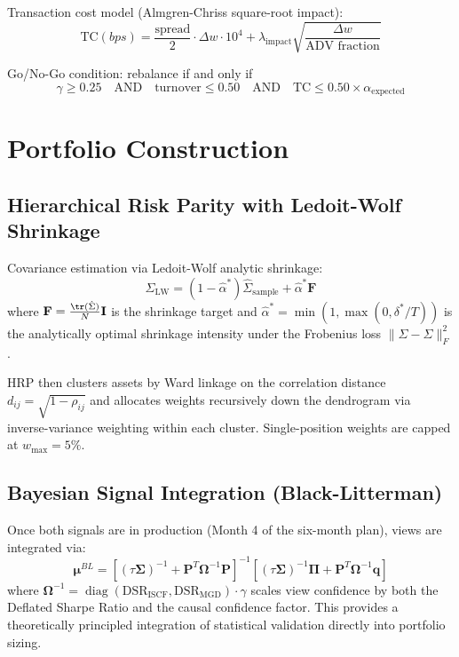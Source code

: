 \documentclass[12pt,a4paper]{article}
\begin{document}
Transaction cost model (Almgren-Chriss square-root impact):
\begin{equation}
  \text{TC}(bps) = \frac{\text{spread}}{2} \cdot \Delta w \cdot 10^4 + \lambda_{\text{impact}}\sqrt{\frac{\Delta w}{\text{ADV fraction}}}
  \label{eq:tca}
\end{equation}

Go/No-Go condition: rebalance if and only if
\begin{equation}
  \gamma \geq 0.25 \quad \text{AND} \quad \text{turnover} \leq 0.50 \quad \text{AND} \quad \text{TC} \leq 0.50 \times \alpha_{\text{expected}}
  \label{eq:gonogo}
\end{equation}

\section{Portfolio Construction}
\label{sec:portfolio}

\subsection{Hierarchical Risk Parity with Ledoit-Wolf Shrinkage}

Covariance estimation via Ledoit-Wolf \citeyearpar{ledoit2004} analytic shrinkage:
\begin{equation}
  \hat{\Sigma}_{\text{LW}} = (1 - \hat{\alpha}^*)\hat{\Sigma}_{\text{sample}} + \hat{\alpha}^* \mathbf{F}
  \label{eq:lw}
\end{equation}
where $\mathbf{F} = \frac{\tr(\hat{\Sigma})}{N}\mathbf{I}$ is the shrinkage target and $\hat{\alpha}^* = \min(1, \max(0, \delta^*/T))$ is the analytically optimal shrinkage intensity under the Frobenius loss $\|\hat{\Sigma} - \Sigma\|_F^2$.

HRP then clusters assets by Ward linkage on the correlation distance $d_{ij} = \sqrt{1 - \rho_{ij}}$ and allocates weights recursively down the dendrogram via inverse-variance weighting within each cluster. Single-position weights are capped at $w_{\max} = 5\%$.

\subsection{Bayesian Signal Integration (Black-Litterman)}

Once both signals are in production (Month 4 of the six-month plan), views are integrated via:
\begin{equation}
  \boldsymbol{\mu}^{BL} = \left[(\tau\boldsymbol{\Sigma})^{-1} + \mathbf{P}^T\boldsymbol{\Omega}^{-1}\mathbf{P}\right]^{-1}
    \left[(\tau\boldsymbol{\Sigma})^{-1}\boldsymbol{\Pi} + \mathbf{P}^T\boldsymbol{\Omega}^{-1}\mathbf{q}\right]
  \label{eq:bl}
\end{equation}
where $\boldsymbol{\Omega}^{-1} = \operatorname{diag}(\text{DSR}_{\text{ISCF}}, \text{DSR}_{\text{MGD}}) \cdot \gamma$ scales view confidence by both the Deflated Sharpe Ratio and the causal confidence factor. This provides a theoretically principled integration of statistical validation directly into portfolio sizing.
\end{document}
